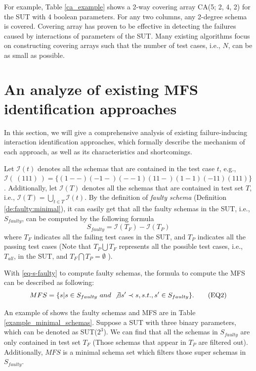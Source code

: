 \documentclass[10pt,journal,cspaper,compsoc]{IEEEtran}
\begin{document}
For example, Table \ref{ca_example} shows a 2-way covering array CA(5; 2, 4, 2) for the SUT with 4 boolean parameters. For any two columns, any 2-degree schema is covered. Covering array has proven to be effective in detecting the failures caused by interactions of parameters of the SUT. Many existing algorithms focus on constructing covering arrays such that the number of test cases, i.e., $N$, can be as small as possible.

\section{An analyze of existing MFS identification approaches}\label{sec:existing_MFS_identification}
In this section, we will give a comprehensive analysis of existing  failure-inducing interaction identification approaches, which formally describe the mechanism of each approach, as well as its characteristics and shortcomings.

Let $\mathcal{I}(t)$ denotes all the schemas that are contained in the test case $t$, e.g., $\mathcal{I}(\ (1 1 1)\ )= \{(1 - -)(- 1 -)(- - 1)(1 1 -)(1 - 1)(- 1 1) (1 1 1)\}$. Additionally, let $\mathcal{I}(T)$ denotes all the schemas that are contained in test set $T$, i.e., $\mathcal{I}(T) = \bigcup_{t\in T} \mathcal{I}(t)$. By the definition of \emph{faulty schema} (Definition \ref{de:faulty:minimal}), it can easily get that all the faulty schemas in the SUT, i.e., $S_{faulty}$, can be computed by the following formula
\begin{displaymath} S_{faulty} = \mathcal{I}(T_{F}) - \mathcal{I}(T_{P}) \tag{EQ1} \label{eq-s-faulty} \end{displaymath}
where $T_{F}$ indicates all the failing test cases in the SUT, and $T_{P}$ indicates all the passing test cases (Note that $T_{P} \bigcup T_{F}$ represents all the possible test cases, i.e., $T_{all}$, in the SUT, and $T_{F} \bigcap T_{P} = \emptyset $ ).

With \ref{eq-s-faulty} to compute faulty schemas, the formula to compute the MFS can be described as following:
\begin{displaymath} MFS =  \{s | s \in S_{faulty}\ and\ \not\exists s' \prec s, s.t., s' \in S_{faulty}\}. \tag{EQ2} \label{eq-s-mfs} \end{displaymath}

An example of shows the faulty schemas and MFS are in Table \ref{example_minimal_schemas}. Suppose a SUT with three binary parameters, which can be denoted as SUT($2^3$). We can find that all the schemas in $S_{faulty}$ are only contained in test set $T_{F}$ (Those schemas that appear in $T_{P}$ are filtered out). Additionally, $MFS$ is a minimal schema set which filters those super schemas in $S_{faulty}$.
\end{document}
